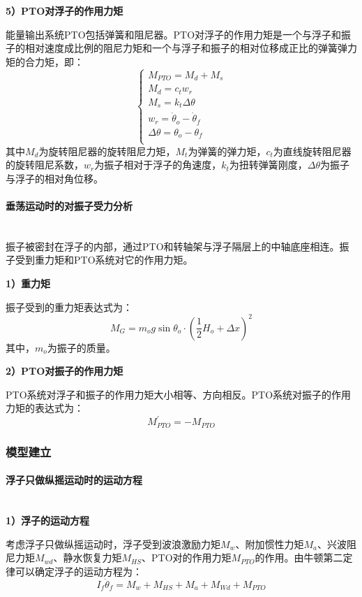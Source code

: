 \documentclass{my_paper}
\newcommand{\subsubsubsection}[1]{\paragraph{#1}\mbox{}\\}
\begin{document}
\textbf{5）PTO对浮子的作用力矩}

能量输出系统PTO包括弹簧和阻尼器。PTO对浮子的作用力矩是一个与浮子和振子的相对速度成比例的阻尼力矩和一个与浮子和振子的相对位移成正比的弹簧弹力矩的合力矩，即：
\begin{equation}\label{Q3fPTO}
    \begin{cases}
    M_{PTO}=M_{d}+M_{s}  \\
    M_{d}=c_{t}w_{r}  \\
    M_{s}=k_{t}\Delta \theta  \\ 
    w_{r}=\dot \theta_{o}-\dot \theta_{f} \\
    \Delta \theta=\theta_{o}-\theta_{f} \\
    \end{cases}
\end{equation}
其中$M_{d}$为旋转阻尼器的旋转阻尼力矩，$M_{t}$为弹簧的弹力矩，$c_{t}$为直线旋转阻尼器的旋转阻尼系数，$w_{r}$为振子相对于浮子的角速度，$k_{t}$为扭转弹簧刚度，$\Delta \theta$为振子与浮子的相对角位移。


\subsubsubsection{垂荡运动时的对振子受力分析}

振子被密封在浮子的内部，通过PTO和转轴架与浮子隔层上的中轴底座相连。振子受到重力矩和PTO系统对它的作用力矩。

\textbf{1）重力矩}

振子受到的重力矩表达式为：
\begin{equation}\label{Q3ozhongliju}
    M_{G}=m_{o}g\sin{\theta_{o}}\cdot (\frac{1}{2}H_{o}+\Delta x)^2 
\end{equation}
其中，$m_{o}$为振子的质量。

\textbf{2）PTO对振子的作用力矩}

PTO系统对浮子和振子的作用力矩大小相等、方向相反。PTO系统对振子的作用力矩的表达式为：
\begin{equation}\label{Q3oPTO}
    M_{PTO}^{'}=-M_{PTO}
\end{equation}



\subsubsection{模型建立}

\subsubsubsection{浮子只做纵摇运动时的运动方程}

    \textbf{1）浮子的运动方程}
    
    考虑浮子只做纵摇运动时，浮子受到波浪激励力矩$M_{w}$、附加惯性力矩$M_{a}$、兴波阻尼力矩$M_{wd}$、静水恢复力矩$M_{HS}$、PTO对的作用力矩$M_{PTO}$的作用。由牛顿第二定律可以确定浮子的运动方程为：
    \begin{equation}
        I_{f} \ddot \theta_{f} = M_w+M_{HS}+M_a+M_{Wd}+M_{PTO}
    \end{equation}
    
\end{document}
